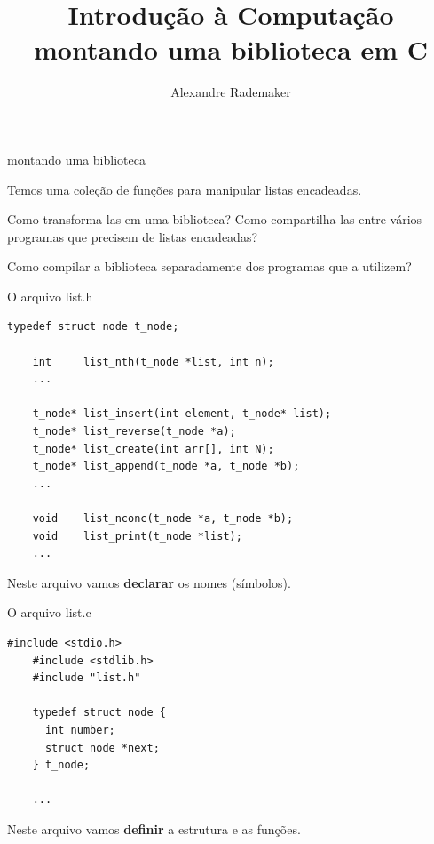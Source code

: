 \documentclass{beamer}
\title{Introdução à Computação \\ montando uma biblioteca em C}
\author{Alexandre Rademaker}
\date{}
\begin{document}
\begin{frame}
 \maketitle
\end{frame}

\begin{frame}{montando uma biblioteca}

  Temos uma coleção de funções para manipular listas encadeadas.

  Como transforma-las em uma biblioteca? Como compartilha-las entre
  vários programas que precisem de listas encadeadas?

  Como compilar a biblioteca separadamente dos programas que a
  utilizem?

\end{frame}


\begin{frame}[fragile]{O arquivo list.h}

  \begin{lstlisting}[style=normalc,caption=src/list.h]
    typedef struct node t_node;

    int     list_nth(t_node *list, int n);
    ...
    
    t_node* list_insert(int element, t_node* list);
    t_node* list_reverse(t_node *a);
    t_node* list_create(int arr[], int N);
    t_node* list_append(t_node *a, t_node *b);
    ...

    void    list_nconc(t_node *a, t_node *b);
    void    list_print(t_node *list);
    ...
  \end{lstlisting}

  Neste arquivo vamos \textbf{declarar} os nomes (símbolos).

\end{frame}


\begin{frame}[fragile]{O arquivo list.c}

  \begin{lstlisting}[style=normalc,caption=src/list.c]
    #include <stdio.h>
    #include <stdlib.h>
    #include "list.h"

    typedef struct node {
      int number;
      struct node *next;
    } t_node;

    ...
  \end{lstlisting}

  Neste arquivo vamos \textbf{definir} a estrutura e as funções.

\end{frame}
\end{document}

